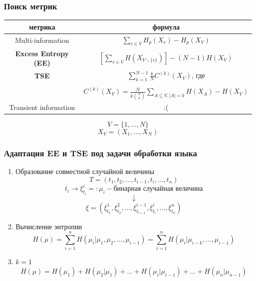 \documentclass{beamer}
\begin{document}
\begin{frame}
	\frametitle{Поиск метрик}
	\let\thefootnote\relax{}
		
	\begin{table}
		\begin{tabular}{c|c}
			\hline
			метрика & формула \\
			\hline
			Multi-information & $\sum\limits_{v\in V}H_p(X_v) - H_p(X_V)$ \\
			\hline
			{\bf Excess Entropy (EE)} & $\left[\sum\limits_{v\in V}H(X_{V\backslash\{v\}})\right] - (N - 1)H(X_V)$ \\
			\hline
			{\bf TSE} & $\sum\limits_{k=1}^{N-1}\frac{k}{N}C^{(k)}(X_V)$, где \\\\
			& $C^{(k)}(X_V) = \frac{N}{k\binom{N}{k}}\sum\limits_{A\subseteq V,|A|=k}H(X_A) - H(X_V)$ \\
			\hline
			Transient information & :( \\
			\hline
		\end{tabular}
	\end{table}

	\[
		V=\{1,\ldots,N\}
	\]
	\[
		X_V = (X_1,\ldots,X_N)
	\]
\end{frame}

\begin{frame}
	\frametitle{Адаптация EE и TSE под задачи обработки языка}
	
	\begin{enumerate}
		\item Образование совместной случайной величины
		\[
			T=(t_1, t_2, \ldots, t_{i-1},t_i,\ldots, t_n)
		\]
		\[
			t_i\rightarrow \xi^i_{t_i} =: \mu_i - \text{бинарная случайная величина}
		\]
		\[
			\downarrow
		\]
		\[
			\xi=(\xi^1_{t_1},\xi^2_{t_2},\ldots,\xi^{i-1}_{t_{i-1}},\xi^i_{t_i},\ldots,\xi^n_{t_n})
		\]
		\item Вычисление энтропии
		\[
			H(\mu) = \sum\limits_{i=1}^{n}H(\mu_i|\mu_1,\mu_2,\ldots,\mu_{i-1}) = \sum\limits_{i=1}^{n}H(\mu_i|\mu_{i-k},\ldots,\mu_{i-1})
		\]
		\item $k=1$
		\[
		H(\mu) = H(\mu_1) + H(\mu_2|\mu_1) + \ldots + H(\mu_i|\mu_{i-1}) + \ldots + H(\mu_n|\mu_{n-1})
		\]
	\end{enumerate}
\end{frame}
\end{document}
